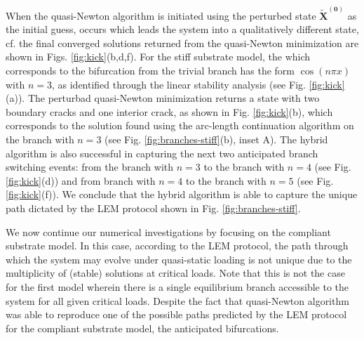 When the quasi-Newton algorithm is initiated using the perturbed state \(\mathbf{\tilde X^{(0)}}\)
as the initial guess,  occurs which leads the system into a qualitatively different state, cf. the final  converged solutions returned from the quasi-Newton minimization are shown in Figs. \ref{fig:kick}(b,d,f). For the stiff substrate model, the  which corresponds to the bifurcation from the trivial branch has the form \(\cos(n\pi x)\) with \(n=3\), as identified through the linear stability analysis (see Fig. \ref{fig:kick}(a)). 
The perturbad quasi-Newton minimization returns a state with two boundary cracks and one interior crack, as shown in Fig. \ref{fig:kick}(b), which corresponds to the solution found using the arc-length continuation algorithm on the branch with \(n=3\) (see Fig. \ref{fig:branches-stiff}(b), inset A).  The hybrid algorithm is also successful in capturing the next two anticipated branch   switching events: from the  branch with \(n=3\)  to the branch  with \(n=4\) (see Fig. \ref{fig:kick}(d)) and  from branch with \(n=4\)  to the branch  with \(n=5\) (see Fig. \ref{fig:kick}(f)). We conclude that the hybrid algorithm is able to capture the unique path dictated by the LEM protocol shown in Fig. \ref{fig:branches-stiff}.   

We now continue our numerical investigations by focusing on the compliant substrate model. In this case, according to the LEM protocol, the path through which the system may evolve under quasi-static loading is not unique due to the multiplicity of (stable) solutions at critical loads.
Note that this is not the case for the first model wherein there is a single equilibrium branch accessible to the system for all given critical loads.
Despite the fact that quasi-Newton algorithm was able to reproduce one of the possible paths predicted by the LEM protocol for the compliant substrate model, the   anticipated bifurcations. 


